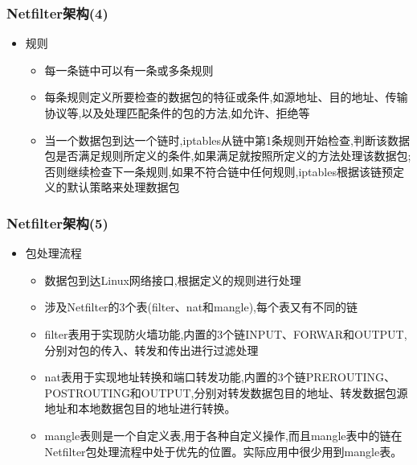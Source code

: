 \documentclass[xcolor=svgnames,presentation]{beamer}
\begin{document}
\begin{frame}
\frametitle{Netfilter架构(4)}
\label{sec-2-4}
\begin{itemize}

\item 规则
\label{sec-2-4-1}%
\begin{itemize}

\item 每一条链中可以有一条或多条规则
\label{sec-2-4-1-1}%

\item 每条规则定义所要检查的数据包的特征或条件,如源地址、目的地址、传输协议等,以及处理匹配条件的包的方法,如允许、拒绝等
\label{sec-2-4-1-2}%

\item 当一个数据包到达一个链时,iptables从链中第1条规则开始检查,判断该数据包是否满足规则所定义的条件,如果满足就按照所定义的方法处理该数据包;否则继续检查下一条规则,如果不符合链中任何规则,iptables根据该链预定义的默认策略来处理数据包
\label{sec-2-4-1-3}%
\end{itemize} %
\end{itemize} %
\end{frame}
\begin{frame}
\frametitle{Netfilter架构(5)}
\label{sec-2-5}
\begin{itemize}

\item 包处理流程
\label{sec-2-5-1}%
\begin{itemize}

\item 数据包到达Linux网络接口,根据定义的规则进行处理
\label{sec-2-5-1-1}%

\item 涉及Netfilter的3个表(filter、nat和mangle),每个表又有不同的链
\label{sec-2-5-1-2}%

\item filter表用于实现防火墙功能,内置的3个链INPUT、FORWAR和OUTPUT,分别对包的传入、转发和传出进行过滤处理
\label{sec-2-5-1-3}%

\item nat表用于实现地址转换和端口转发功能,内置的3个链PREROUTING、POSTROUTING和OUTPUT,分别对转发数据包目的地址、转发数据包源地址和本地数据包目的地址进行转换。
\label{sec-2-5-1-4}%

\item mangle表则是一个自定义表,用于各种自定义操作,而且mangle表中的链在Netfilter包处理流程中处于优先的位置。实际应用中很少用到mangle表。
\label{sec-2-5-1-5}%
\end{itemize} %
\end{itemize} %
\end{frame}
\end{document}
